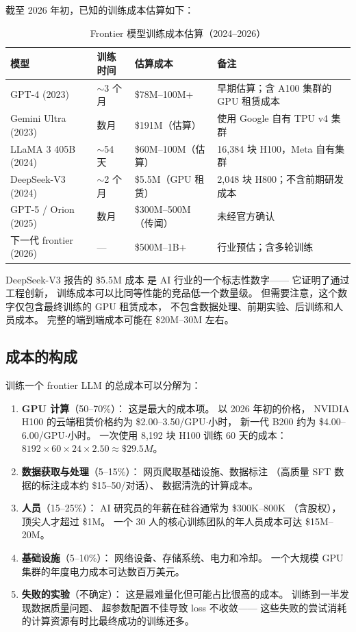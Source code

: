 截至 2026 年初，已知的训练成本估算如下：

\begin{table}[H]
\centering\small
\caption{Frontier 模型训练成本估算（2024--2026）}
\begin{tabularx}{\linewidth}{l l l X}
\toprule
\textbf{模型} & \textbf{训练时间} & \textbf{估算成本} & \textbf{备注} \\
\midrule
GPT-4 (2023) & $\sim$3 个月 & \$78M--100M+ &
  早期估算；含 A100 集群的 GPU 租赁成本 \\
Gemini Ultra (2023) & 数月 & \$191M（估算） &
  使用 Google 自有 TPU v4 集群 \\
LLaMA 3 405B (2024) & $\sim$54 天 & \$60M--100M（估算） &
  16,384 块 H100，Meta 自有集群 \\
DeepSeek-V3 (2024) & $\sim$2 个月 & \$5.5M（GPU 租赁） &
  2,048 块 H800；不含前期研发成本 \\
GPT-5 / Orion (2025) & 数月 & \$300M--500M（传闻） &
  未经官方确认 \\
下一代 frontier (2026) & --- & \$500M--1B+ &
  行业预估；含多轮训练 \\
\bottomrule
\end{tabularx}
\end{table}

DeepSeek-V3 报告的 \$5.5M 成本
是 AI 行业的一个标志性数字——
它证明了通过工程创新，
训练成本可以比同等性能的竞品低一个数量级。
但需要注意，这个数字仅包含最终训练的 GPU 租赁成本，
不包含数据处理、前期实验、后训练和人员成本。
完整的端到端成本可能在 \$20M--30M 左右。

\subsection{成本的构成}

训练一个 frontier LLM 的总成本可以分解为：

\begin{enumerate}[noitemsep]
  \item \textbf{GPU 计算}（50--70\%）：
        这是最大的成本项。
        以 2026 年初的价格，
        NVIDIA H100 的云端租赁价格约为 \$2.00--3.50/GPU$\cdot$小时，
        新一代 B200 约为 \$4.00--6.00/GPU$\cdot$小时。
        一次使用 8,192 块 H100 训练 60 天的成本：
        $8192 \times 60 \times 24 \times 2.50 \approx \$29.5M$。
  \item \textbf{数据获取与处理}（5--15\%）：
        网页爬取基础设施、数据标注
        （高质量 SFT 数据的标注成本约 \$15--50/对话）、
        数据清洗的计算成本。
  \item \textbf{人员}（15--25\%）：
        AI 研究员的年薪在硅谷通常为 \$300K--800K
        （含股权），顶尖人才超过 \$1M。
        一个 30 人的核心训练团队的年人员成本可达 \$15M--20M。
  \item \textbf{基础设施}（5--10\%）：
        网络设备、存储系统、电力和冷却。
        一个大规模 GPU 集群的年度电力成本可达数百万美元。
  \item \textbf{失败的实验}（不确定）：
        这是最难量化但可能占比很高的成本。
        训练到一半发现数据质量问题、
        超参数配置不佳导致 loss 不收敛——
        这些失败的尝试消耗的计算资源有时比最终成功的训练还多。
\end{enumerate}

